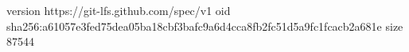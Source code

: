 version https://git-lfs.github.com/spec/v1
oid sha256:a61057e3fed75dea05ba18cbf3bafc9a6d4cca8fb2fc51d5a9fc1fcacb2a681e
size 87544
